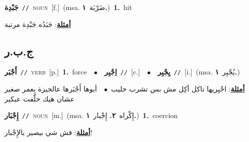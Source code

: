 \documentclass[10pt,a4paper,twoside]{article} %
\begin{document}
\begin{multicols}{2}
{\setlength\topsep{0pt}\textbf{\foreignlanguage{arabic}{جَبْدِة}}\ {\color{gray}\texttt{//}\color{black}}\ \textsc{noun}\ [f.]\ \color{gray}(msa. \foreignlanguage{arabic}{ضَرْبَة}~\foreignlanguage{arabic}{\textbf{١.}})\color{black}\ \textbf{1.}~hit\  \begin{flushright}\color{gray}\foreignlanguage{arabic}{\textbf{\underline{\foreignlanguage{arabic}{أمثلة}}}: جَبَدُه جَبْدِة مرتبة}\end{flushright}\color{black}} \vspace{2mm}

\vspace{-3mm}
\subsection*{\color{blue}\foreignlanguage{arabic}{ج.ب.ر}\color{blue}{}} 

{\setlength\topsep{0pt}\textbf{\foreignlanguage{arabic}{أَجْبَر}}\ {\color{gray}\texttt{//}\color{black}}\ \textsc{verb}\ [p.]\ \textbf{1.}~force\ \ $\bullet$\ \ \setlength\topsep{0pt}\textbf{\foreignlanguage{arabic}{اِجْبِر}}\ {\color{gray}\texttt{//}\color{black}}\ [c.]\ \ $\bullet$\ \ \setlength\topsep{0pt}\textbf{\foreignlanguage{arabic}{يِجْبِر}}\ {\color{gray}\texttt{//}\color{black}}\ [i.]\ \color{gray}(msa. \foreignlanguage{arabic}{يُجْبِر}~\foreignlanguage{arabic}{\textbf{١.}})\color{black}\  \begin{flushright}\color{gray}\foreignlanguage{arabic}{\textbf{\underline{\foreignlanguage{arabic}{أمثلة}}}: اجْبِريها تاكل أكِل مش بس تشرب حليب\ $\bullet$\ \  أبوها أَجْبَرها عالجيزة بعمر صغير عشان هيك خلَّفت عبكير}\end{flushright}\color{black}} \vspace{2mm}

{\setlength\topsep{0pt}\textbf{\foreignlanguage{arabic}{إِجْبَار}}\ {\color{gray}\texttt{//}\color{black}}\ \textsc{noun}\ [m.]\ \color{gray}(msa. \foreignlanguage{arabic}{إِكْراه}~\foreignlanguage{arabic}{\textbf{٢.}}  \foreignlanguage{arabic}{إِجْبار}~\foreignlanguage{arabic}{\textbf{١.}})\color{black}\ \textbf{1.}~coercion\  \begin{flushright}\color{gray}\foreignlanguage{arabic}{\textbf{\underline{\foreignlanguage{arabic}{أمثلة}}}: فش شي بيصير بالإِجْبار!}\end{flushright}\color{black}} \vspace{2mm}


\end{multicols}
\end{document}
